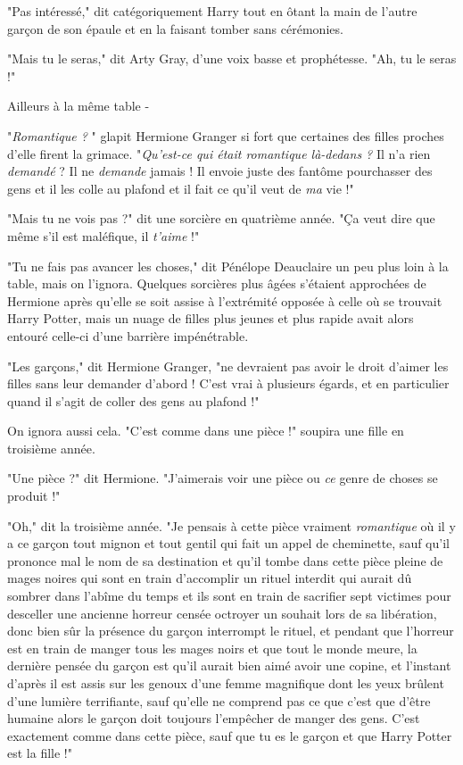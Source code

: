 "Pas intéressé," dit catégoriquement Harry tout en ôtant la main de l'autre garçon de son épaule et en la faisant tomber sans cérémonies.

"Mais tu le seras," dit Arty Gray, d'une voix basse et prophétesse. "Ah, tu le seras !"

Ailleurs à la même table -

"\emph{Romantique ?} " glapit Hermione Granger si fort que certaines des filles proches d'elle firent la grimace. "\emph{Qu'est-ce qui était romantique là-dedans ? } Il n'a rien \emph{demandé}  ? Il ne \emph{demande}  jamais ! Il envoie juste des fantôme pourchasser des gens et il les colle au plafond et il fait ce qu'il veut de \emph{ma}  vie !"

"Mais tu ne vois pas ?" dit une sorcière en quatrième année. "Ça veut dire que même s'il est maléfique, il \emph{t'aime}  !"

"Tu ne fais pas avancer les choses," dit Pénélope Deauclaire un peu plus loin à la table, mais on l'ignora. Quelques sorcières plus âgées s'étaient approchées de Hermione après qu'elle se soit assise à l'extrémité opposée à celle où se trouvait Harry Potter, mais un nuage de filles plus jeunes et plus rapide avait alors entouré celle-ci d'une barrière impénétrable.

"Les garçons," dit Hermione Granger, "ne devraient pas avoir le droit d'aimer les filles sans leur demander d'abord ! C'est vrai à plusieurs égards, et en particulier quand il s'agit de coller des gens au plafond !"

On ignora aussi cela. "C'est comme dans une pièce !" soupira une fille en troisième année.

"Une pièce ?" dit Hermione. "J'aimerais voir une pièce ou \emph{ce}  genre de choses se produit !"

"Oh," dit la troisième année. "Je pensais à cette pièce vraiment \emph{romantique}  où il y a ce garçon tout mignon et tout gentil qui fait un appel de cheminette, sauf qu'il prononce mal le nom de sa destination et qu'il tombe dans cette pièce pleine de mages noires qui sont en train d'accomplir un rituel interdit qui aurait dû sombrer dans l'abîme du temps et ils sont en train de sacrifier sept victimes pour desceller une ancienne horreur censée octroyer un souhait lors de sa libération, donc bien sûr la présence du garçon interrompt le rituel, et pendant que l'horreur est en train de manger tous les mages noirs et que tout le monde meure, la dernière pensée du garçon est qu'il aurait bien aimé avoir une copine, et l'instant d'après il est assis sur les genoux d'une femme magnifique dont les yeux brûlent d'une lumière terrifiante, sauf qu'elle ne comprend pas ce que c'est que d'être humaine alors le garçon doit toujours l'empêcher de manger des gens. C'est exactement comme dans cette pièce, sauf que tu es le garçon et que Harry Potter est la fille !"

